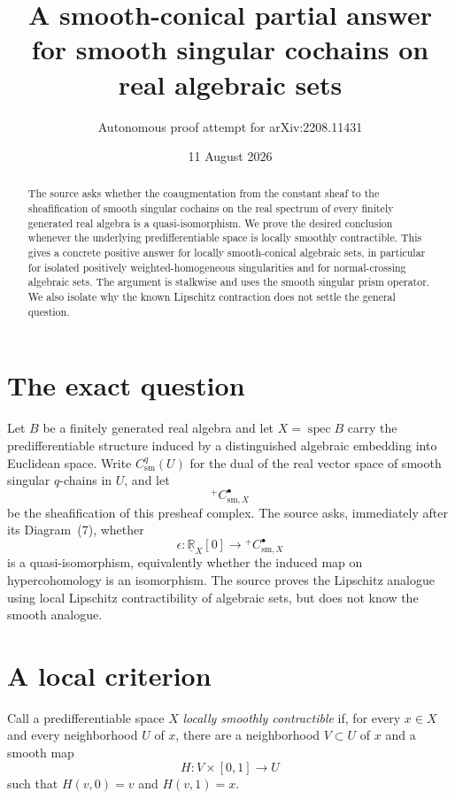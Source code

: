\documentclass[11pt]{article}
\title{A smooth-conical partial answer for smooth singular cochains on real algebraic sets}
\author{Autonomous proof attempt for arXiv:2208.11431}
\date{11 August 2026}
\newcommand{\R}{\mathbb R}
\newcommand{\cC}{C}
\begin{document}
\maketitle

\begin{abstract}
The source asks whether the coaugmentation from the constant sheaf to the
sheafification of smooth singular cochains on the real spectrum of every
finitely generated real algebra is a quasi-isomorphism.  We prove the desired
conclusion whenever the underlying predifferentiable space is locally smoothly
contractible.  This gives a concrete positive answer for locally
smooth-conical algebraic sets, in particular for isolated positively
weighted-homogeneous singularities and for normal-crossing algebraic sets.
The argument is stalkwise and uses the smooth singular prism operator.  We
also isolate why the known Lipschitz contraction does not settle the general
question.
\end{abstract}

\section{The exact question}

Let $B$ be a finitely generated real algebra and let $X=\operatorname{spec}B$
carry the predifferentiable structure induced by a distinguished algebraic
embedding into Euclidean space.  Write $\cC^q_{\mathrm{sm}}(U)$ for the dual
of the real vector space of smooth singular $q$-chains in $U$, and let
$${}^{+}\cC^\bullet_{\mathrm{sm},X}$$
be the sheafification of this presheaf complex.  The source asks, immediately
after its Diagram~(7), whether
\begin{equation}\label{eq:epsilon}
 \epsilon:\underline{\R}_X[0]\longrightarrow
 {}^{+}\cC^\bullet_{\mathrm{sm},X}
\end{equation}
is a quasi-isomorphism, equivalently whether the induced map on
hypercohomology is an isomorphism.  The source proves the Lipschitz analogue
using local Lipschitz contractibility of algebraic sets, but does not know the
smooth analogue.

\section{A local criterion}

Call a predifferentiable space $X$ \emph{locally smoothly contractible} if,
for every $x\in X$ and every neighborhood $U$ of $x$, there are a neighborhood
$V\subset U$ of $x$ and a smooth map
$$H:V\times[0,1]\longrightarrow U$$
such that $H(v,0)=v$ and $H(v,1)=x$.
\end{document}
